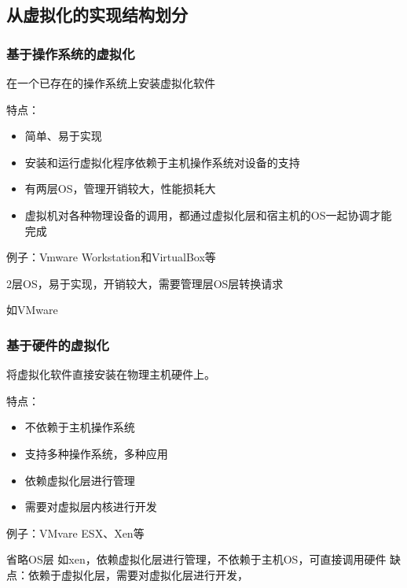\subsection{从虚拟化的实现结构划分}

\subsubsection{基于操作系统的虚拟化}
\begin{definition}[基于操作系统的虚拟化]
    在一个已存在的操作系统上安装虚拟化软件

    特点：
    
    \begin{itemize}
        \item 简单、易于实现
        \item 安装和运行虚拟化程序依赖于主机操作系统对设备的支持
        \item 有两层OS，管理开销较大，性能损耗大
        \item 虚拟机对各种物理设备的调用，都通过虚拟化层和宿主机的OS一起协调才能完成
    \end{itemize}

    例子：Vmware Workstation和VirtualBox等
\end{definition}

2层OS，易于实现，开销较大，需要管理层OS层转换请求 

如VMware

\subsubsection{基于硬件的虚拟化}

\begin{definition}[基于硬件的虚拟化]
    将虚拟化软件直接安装在物理主机硬件上。 

    特点：
    \begin{itemize}
        \item 不依赖于主机操作系统
        \item 支持多种操作系统，多种应用
        \item 依赖虚拟化层进行管理
        \item 需要对虚拟层内核进行开发
    \end{itemize}

例子：VMvare ESX、Xen等
\end{definition}

省略OS层 如xen，依赖虚拟化层进行管理，不依赖于主机OS，可直接调用硬件 缺点：依赖于虚拟化层，需要对虚拟化层进行开发， 

